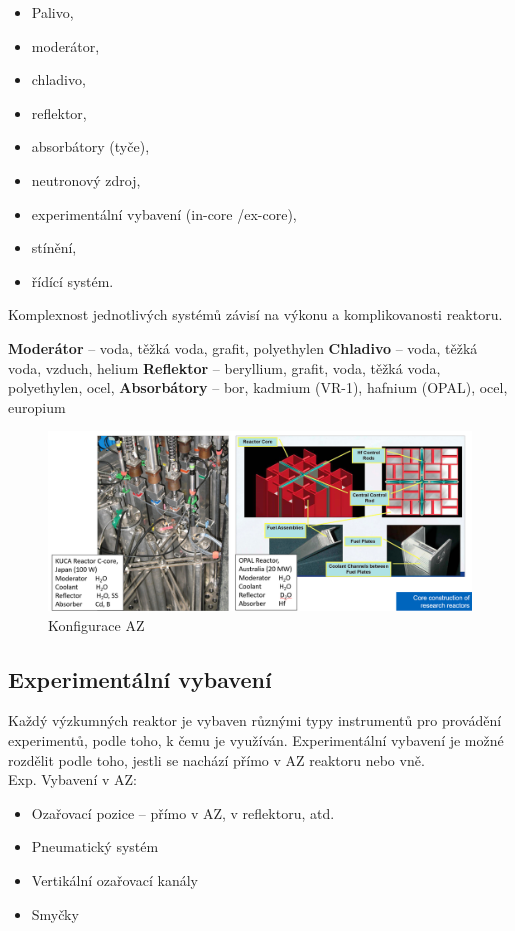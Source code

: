 \begin{itemize}
    \item Palivo,
    \item moderátor,
    \item chladivo,
    \item reflektor,
    \item absorbátory (tyče),
    \item neutronový zdroj,
    \item experimentální vybavení (in-core /ex-core),
    \item stínění,
    \item řídící systém.
\end{itemize}

Komplexnost jednotlivých systémů závisí na výkonu a komplikovanosti reaktoru.

\textbf{Moderátor} -- voda, těžká voda, grafit, polyethylen
\textbf{Chladivo} -- voda, těžká voda, vzduch, helium
\textbf{Reflektor} -- beryllium, grafit, voda, těžká voda, polyethylen, ocel,
\textbf{Absorbátory} -- bor, kadmium (VR-1), hafnium (OPAL), ocel, europium

\begin{figure}[H]
    \centering
    \includegraphics[width=0.75\linewidth]{img/KonfiguraceAZ.png}
    \caption{Konfigurace AZ}
    \label{fig:enter-label}
\end{figure}

\subsection{Experimentální vybavení}

Každý výzkumných reaktor je vybaven různými typy instrumentů pro provádění experimentů, podle toho, k čemu je využíván.  Experimentální vybavení je možné rozdělit podle toho, jestli se nachází přímo v AZ reaktoru nebo vně. \\
Exp. Vybavení v AZ:

\begin{itemize}
    \item Ozařovací pozice -- přímo v AZ, v reflektoru, atd.
    \item Pneumatický systém
    \item Vertikální ozařovací kanály
    \item Smyčky
\end{itemize}

